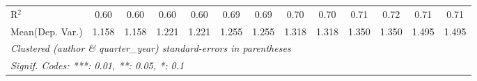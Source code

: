 \begin{tabular}{lcccccccccccc}
   R$^2$                                    & 0.60          & 0.60         & 0.60    & 0.60         & 0.69         & 0.69    & 0.70         & 0.70    & 0.71    & 0.72          & 0.71    & 0.71\\  
Mean(Dep. Var.) & 1.158 & 1.158 & 1.221 & 1.221 & 1.255 & 1.255 & 1.318 & 1.318 & 1.350 & 1.350 & 1.495 & 1.495 \\
   \midrule \midrule
   \multicolumn{13}{l}{\emph{Clustered (author \& quarter\_year) standard-errors in parentheses}}\\
   \multicolumn{13}{l}{\emph{Signif. Codes: ***: 0.01, **: 0.05, *: 0.1}}\\
\end{tabular}
\par\endgroup
